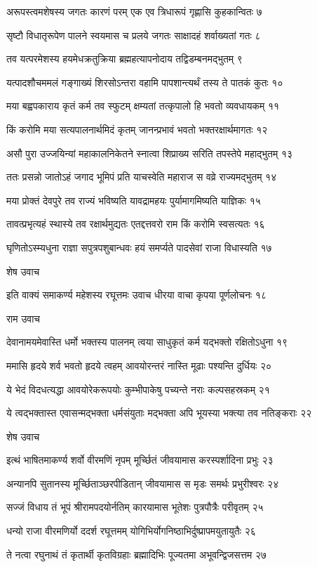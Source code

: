 अरूपस्त्वमशेषस्य जगतः कारणं परम्
एक एव त्रिधारूपं गृह्णासि कुहकान्वितः ७

सृष्टौ विधातृरूपेण पालने स्वयमास च
प्रलये जगतः साक्षादहं शर्वाख्यतां गतः ८

तव यत्परमेशस्य हयमेधक्रतुक्रिया
ब्रह्महत्यापनोदाय तद्विडम्बनमद्भुतम् ९

यत्पादशौचममलं गङ्गाख्यं शिरसोऽन्तरा
वहामि पापशान्त्यर्थं तस्य ते पातकं कुतः १०

मया बह्वपकाराय कृतं कर्म तव स्फुटम्
क्षम्यतां तत्कृपालो हि भवतो व्यवधायकम् ११

किं करोमि मया सत्यपालनार्थमिदं कृतम्
जानन्प्रभावं भवतो भक्तरक्षार्थमागतः १२

असौ पुरा उज्जयिन्यां महाकालनिकेतने
स्नात्वा शिप्राख्य सरिति तपस्तेपे महाद्भुतम् १३

ततः प्रसन्नो जातोऽहं जगाद भूमिपं प्रति
याचस्वेति महाराज स वव्रे राज्यमद्भुतम् १४

मया प्रोक्तं देवपुरे तव राज्यं भविष्यति
यावद्रामहयः पुर्यामागमिष्यति याज्ञिकः १५

तावत्प्रभृत्यहं स्थास्ये तव रक्षार्थमुद्यतः
एतद्दत्तवरो राम किं करोमि स्वसत्यतः १६

घृणितोऽस्म्यधुना राज्ञा सपुत्रपशुबान्धवः
हयं समर्प्यते पादसेवां राजा विधास्यति १७

शेष उवाच

इति वाक्यं समाकर्ण्य महेशस्य रघूत्तमः
उवाच धीरया वाचा कृपया पूर्णलोचनः १८

राम उवाच

देवानामयमेवास्ति धर्मो भक्तस्य पालनम्
त्वया साधुकृतं कर्म यद्भक्तो रक्षितोऽधुना १९

ममासि हृदये शर्व भवतो हृदये त्वहम्
आवयोरन्तरं नास्ति मूढाः पश्यन्ति दुर्धियः २०

ये भेदं विदधत्यद्धा आवयोरेकरूपयोः
कुम्भीपाकेषु पच्यन्ते नराः कल्पसहस्रकम् २१

ये त्वद्भक्तास्त एवासन्मद्भक्ता धर्मसंयुताः
मद्भक्ता अपि भूयस्या भक्त्या तव नतिङ्कराः २२

शेष उवाच

इत्थं भाषितमाकर्ण्य शर्वो वीरमणिं नृपम्
मूर्च्छितं जीवयामास करस्पर्शादिना प्रभुः २३

अन्यानपि सुतानस्य मूर्च्छिताञ्छरपीडितान्
जीवयामास स मृडः समर्थः प्रभुरीश्वरः २४

सज्जं विधाय तं भूपं श्रीरामपदयोर्नतिम्
कारयामास भूतेशः पुत्रपौत्रैः परीवृतम् २५

धन्यो राजा वीरमणिर्यो ददर्श रघूत्तमम्
योगिभिर्योगनिष्ठाभिर्दुष्प्रापमयुतायुतैः २६

ते नत्वा रघुनाथं तं कृतार्थी कृतविग्रहाः
ब्रह्मादिभिः पूज्यतमा अभूवन्द्विजसत्तम २७


